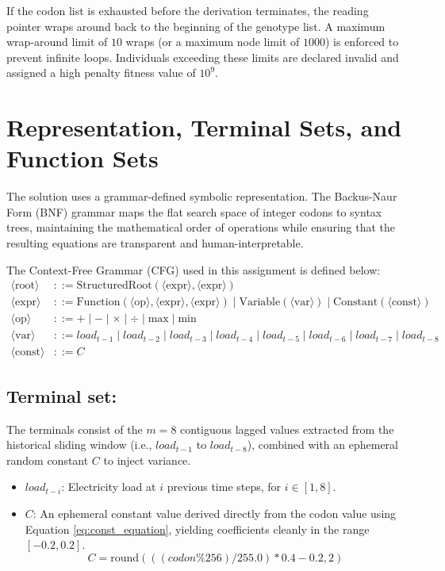 \documentclass[12pt]{article}
\begin{document}
    If the codon list is exhausted before the derivation terminates, the reading pointer wraps around back to the beginning of the genotype list. A maximum wrap-around limit of $10$ wraps (or a maximum node limit of $1000$) is enforced to prevent infinite loops. Individuals exceeding these limits are declared invalid and assigned a high penalty fitness value of $10^9$.

\section{Representation, Terminal Sets, and Function Sets}
    The solution uses a grammar-defined symbolic representation. The Backus-Naur Form (BNF) grammar maps the flat search space of integer codons to syntax trees, maintaining the mathematical order of operations while ensuring that the resulting equations are transparent and human-interpretable.

    The Context-Free Grammar (CFG) used in this assignment is defined below:
    \begin{align*}
        \langle\text{root}\rangle &::= \text{StructuredRoot}(\langle\text{expr}\rangle, \langle\text{expr}\rangle) \\
        \langle\text{expr}\rangle &::= \text{Function}(\langle\text{op}\rangle, \langle\text{expr}\rangle, \langle\text{expr}\rangle) \mid \text{Variable}(\langle\text{var}\rangle) \mid \text{Constant}(\langle\text{const}\rangle) \\
        \langle\text{op}\rangle &::= + \mid - \mid \times \mid \div \mid \text{max} \mid \text{min} \\
        \langle\text{var}\rangle &::= load_{t-1} \mid load_{t-2} \mid load_{t-3} \mid load_{t-4} \mid load_{t-5} \mid load_{t-6} \mid load_{t-7} \mid load_{t-8} \\
        \langle\text{const}\rangle &::= C
    \end{align*}

    \subsection{Terminal set:}
    The terminals consist of the $m=8$ contiguous lagged values extracted from the historical sliding window (i.e., $load_{t-1}$ to $load_{t-8}$), combined with an ephemeral random constant $C$ to inject variance.
    \begin{itemize}
        \item $load_{t-i}$: Electricity load at $i$ previous time steps, for $i \in [1,8]$.
        \item $C$: An ephemeral constant value derived directly from the codon value using Equation \ref{eq:const_equation}, yielding coefficients cleanly in the range $[-0.2, 0.2]$.
        \begin{equation}
            C = \text{round}(((codon \% 256) / 255.0) * 0.4 - 0.2, 2)
            \label{eq:const_equation}
        \end{equation}
    \end{itemize}
    
\end{document}
